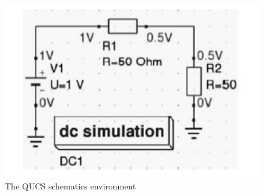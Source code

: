 \documentclass{report}
\begin{document}
\begin{figure}[t]
\includegraphics{Figures/Fig}
\caption{The QUCS schematics environment}
\label{fig:figure2}
\end{figure}
\end{document}
